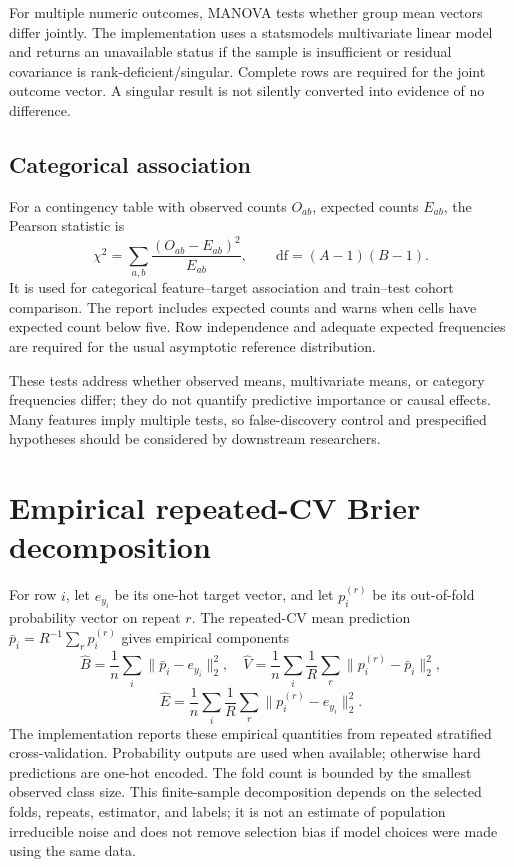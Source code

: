 \documentclass[conference]{IEEEtran}
\begin{document}
For multiple numeric outcomes, MANOVA tests whether group mean vectors differ jointly. The implementation uses a statsmodels multivariate linear model and returns an unavailable status if the sample is insufficient or residual covariance is rank-deficient/singular. Complete rows are required for the joint outcome vector. A singular result is not silently converted into evidence of no difference.

\subsection{Categorical association}
For a contingency table with observed counts \(O_{ab}\), expected counts \(E_{ab}\), the Pearson statistic is
\[
\chi^2=\sum_{a,b}\frac{(O_{ab}-E_{ab})^2}{E_{ab}},
\qquad \mathrm{df}=(A-1)(B-1).
\]
It is used for categorical feature--target association and train--test cohort comparison. The report includes expected counts and warns when cells have expected count below five. Row independence and adequate expected frequencies are required for the usual asymptotic reference distribution.

These tests address whether observed means, multivariate means, or category frequencies differ; they do not quantify predictive importance or causal effects. Many features imply multiple tests, so false-discovery control and prespecified hypotheses should be considered by downstream researchers.

\section{Empirical repeated-CV Brier decomposition}
For row \(i\), let \(e_{y_i}\) be its one-hot target vector, and let \(p_i^{(r)}\) be its out-of-fold probability vector on repeat \(r\). The repeated-CV mean prediction \(\bar p_i=R^{-1}\sum_r p_i^{(r)}\) gives empirical components
\[
\widehat B=\frac1n\sum_i\|\bar p_i-e_{y_i}\|_2^2,\quad
\widehat V=\frac1n\sum_i\frac1R\sum_r\|p_i^{(r)}-\bar p_i\|_2^2,
\]
\[
\widehat E=\frac1n\sum_i\frac1R\sum_r\|p_i^{(r)}-e_{y_i}\|_2^2.
\]
The implementation reports these empirical quantities from repeated stratified cross-validation. Probability outputs are used when available; otherwise hard predictions are one-hot encoded. The fold count is bounded by the smallest observed class size. This finite-sample decomposition depends on the selected folds, repeats, estimator, and labels; it is not an estimate of population irreducible noise and does not remove selection bias if model choices were made using the same data.
\end{document}
